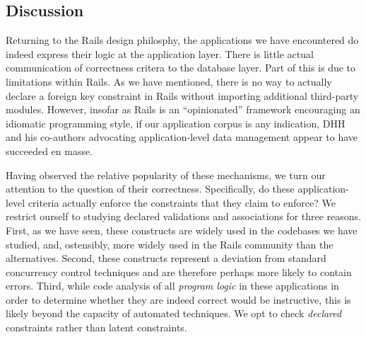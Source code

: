 \subsection{Discussion}

Returning to the Rails design philosphy, the applications we have
encountered do indeed express their logic at the application
layer. There is little actual communication of correctness critera to
the database layer. Part of this is due to limitations within
Rails. As we have mentioned, there is no way to actually declare a
foreign key constraint in Rails without importing additional
third-party modules. However, insofar as Rails is an ``opinionated''
framework encouraging an idiomatic programming style, if our
application corpus is any indication, DHH and his co-authors
advocating application-level data management appear to have succeeded en
masse.

Having observed the relative popularity of these mechanisms, we turn
our attention to the question of their correctness. Specifically, do
these application-level criteria actually enforce the constraints that
they claim to enforce? We restrict ourself to studying declared
validations and associations for three reasons. First, as we have
seen, these constructs are widely used in the codebases we have
studied, and, ostensibly, more widely used in the Rails community than
the alternatives. Second, these constructs represent a deviation from
standard concurrency control techniques and are therefore perhaps more likely to
contain errors. Third, while code analysis of all \textit{program logic} in
these applications in order to determine whether they are indeed
correct would be instructive, this is likely beyond the capacity of 
automated techniques. We opt to check \textit{declared}
constraints rather than latent constraints.
